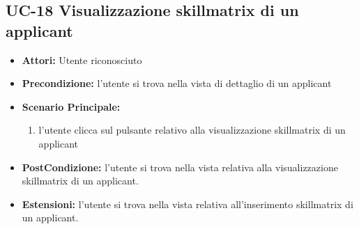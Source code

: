 \subsection{UC-18 Visualizzazione skillmatrix di un applicant}
\begin{itemize}
\item \textbf{Attori:} Utente riconosciuto
\item \textbf{Precondizione:}  l'utente si trova nella vista di dettaglio di un applicant
\item \textbf{Scenario Principale:}
\begin{enumerate}
	\item l'utente clicca sul pulsante relativo alla visualizzazione skillmatrix di un applicant
\end{enumerate}
\item \textbf{PostCondizione:} l'utente si trova nella vista relativa alla visualizzazione skillmatrix di un applicant.
\item \textbf{Estensioni:} l'utente si trova nella vista relativa all'inserimento skillmatrix di un applicant.
\end{itemize}



